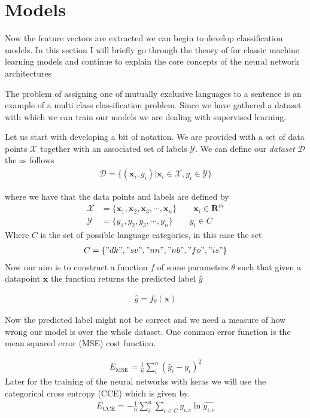 \section{Models}
Now the feature vectors are extracted we can begin to develop classification models. In this section I will briefly go through the theory of for classic machine learning models and continue to explain the core concepts of the neural network architectures

The problem of assigning one of mutually exclusive languages to a sentence is an example of a multi class classification problem. Since we have gathered a dataset with which we can train our models we are dealing with supervised learning.

Let us start with developing a bit of notation.
We are provided with a set of data points $\mathcal{X}$ together with an associated set of labels $\mathcal{Y}$.
We can define our \emph{dataset} $\mathcal{D}$ the as follows
\begin{align}
\mathcal{D} = \{(\mathbf{x}_i,y_i)|\mathbf{x}_i\in\mathcal{X},y_i\in\mathcal{Y}\}
\end{align}

where we have that the data points and labels are defined by
\begin{align}
\mathcal{X}&=\{\mathbf{x}_1, \mathbf{x}_2, \mathbf{x}_3, \cdots,\mathbf{x}_n\} \qquad \mathbf{x}_i \in \mathbf{R}^{m}  \\
\mathcal{Y}&=\{y_1, y_2, y_3, \cdots,y_n\} \qquad y_i \in C
\end{align}
Where $C$ is the set of possible language categories, in this case the set
\begin{align}
  C = \{"dk", "sv", "nn", "nb", "fo", "is"\}
\end{align}
Now our aim is to construct a function $f$ of some parameters $\theta$ such that given a datapoint $\mathbf{x}$ the function returns the predicted label $\hat{y}$

\begin{align}
 \hat{y} = f_\theta (\mathbf{x})
\end{align}

Now the predicted label might not be correct and we need a measure of how wrong our model is over the whole dataset. One common error function is the mean squared error (MSE) cost function.

\begin{align}
  E_{\text{MSE}} = \frac{1}{n}\sum_i^n (\hat{y}_i - y_i)^2
\end{align}
Later for the training of the neural networks with keras we will use the categorical cross entropy (CCE) which is given by.
\begin{align}
  E_{\text{CCE}} = -\frac{1}{n}\sum_i^n \sum_{c\in C} y_{i,c}\ln \hat{y_{i,c}}
\end{align}

